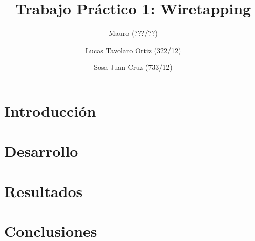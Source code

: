 \documentclass[final,inline,a4paper,narroweqnarray]{ieee}
\let\Oldsection\section
\renewcommand{\section}{\FloatBarrier\Oldsection}
\begin{document}
\title[TP 1: Wiretapping]{%
Trabajo Práctico 1: Wiretapping}

\author[Mauro, Ortiz, Sosa]{%
	Mauro (???/??)
	\and
	Lucas Tavolaro Ortiz (322/12)
	\and
	Sosa Juan Cruz (733/12)
}

\maketitle

\begin{abstract}



\end{abstract}


\section{ Introducción }


\section{Desarrollo}


\section{Resultados}


\section{Conclusiones}

\end{document}
